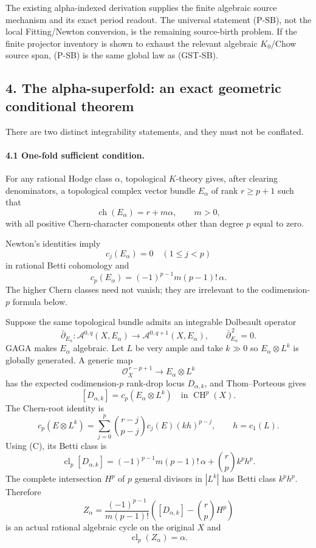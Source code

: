 The existing alpha-indexed derivation supplies the finite algebraic source mechanism and its exact period readout. The universal statement (P-SB), not the local Fitting/Newton conversion, is the remaining source-birth problem. If the finite projector inventory is shown to exhaust the relevant algebraic \(K_0\)/Chow source span, (P-SB) is the same global law as (GST-SB).

\subsection*{4. The alpha-superfold: an exact geometric conditional theorem}

There are two distinct integrability statements, and they must not be conflated.

\paragraph{4.1 One-fold sufficient condition.}
For any rational Hodge class \(\alpha\), topological \(K\)-theory gives, after clearing denominators, a topological complex vector bundle \(E_\alpha\) of rank \(r\ge p+1\) such that
\[
\operatorname{ch}(E_\alpha)=r+m\alpha,\qquad m>0,
\]
with all positive Chern-character components other than degree \(p\) equal to zero.

Newton's identities imply
\[
c_j(E_\alpha)=0\quad(1\le j<p)
\]
in rational Betti cohomology and
\[
c_p(E_\alpha)=(-1)^{p-1}m(p-1)!\,\alpha.
\tag{C}
\]
The higher Chern classes need not vanish; they are irrelevant to the codimension-\(p\) formula below.

Suppose the same topological bundle admits an integrable Dolbeault operator
\[
\bar\partial_{E_\alpha}:
\mathcal A^{0,q}(X,E_\alpha)\longrightarrow
\mathcal A^{0,q+1}(X,E_\alpha),
\qquad
\boxed{\bar\partial_{E_\alpha}^{\,2}=0.}
\tag{I}
\]
GAGA makes \(E_\alpha\) algebraic. Let \(L\) be very ample and take \(k\gg0\) so \(E_\alpha\otimes L^k\) is globally generated. A generic map
\[
\mathcal O_X^{\,r-p+1}\longrightarrow E_\alpha\otimes L^k
\]
has the expected codimension-\(p\) rank-drop locus \(D_{\alpha,k}\), and Thom--Porteous gives
\[
[D_{\alpha,k}]=c_p(E_\alpha\otimes L^k)
\quad\text{in }\operatorname{CH}^p(X).
\]
The Chern-root identity is
\[
c_p(E\otimes L^k)
=
\sum_{j=0}^{p}
\binom{r-j}{p-j}c_j(E)(kh)^{p-j},
\qquad h=c_1(L).
\]
Using (C), its Betti class is
\[
\operatorname{cl}_p[D_{\alpha,k}]
=
(-1)^{p-1}m(p-1)!\,\alpha
+\binom rp k^p h^p.
\]
The complete intersection \(H^p\) of \(p\) general divisors in \(|L^k|\) has Betti class \(k^p h^p\). Therefore
\[
Z_\alpha=
\frac{(-1)^{p-1}}{m(p-1)!}
\left(
[D_{\alpha,k}]-\binom rp H^p
\right)
\]
is an actual rational algebraic cycle on the original \(X\) and
\[
\operatorname{cl}_p(Z_\alpha)=\alpha.
\]

